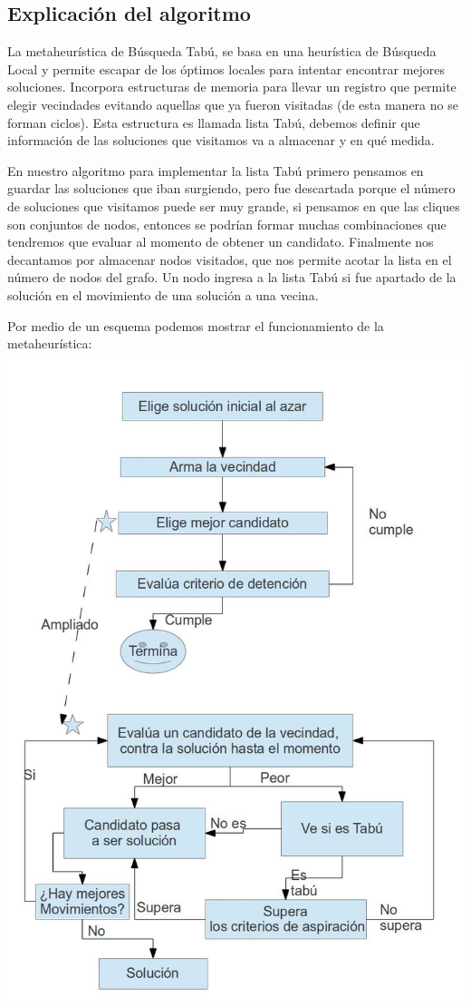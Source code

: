 \subsection{Explicaci\'on del algoritmo}
La metaheurística de Búsqueda Tabú, se basa en una heurística de Búsqueda Local y permite escapar de los óptimos locales para intentar encontrar mejores soluciones. Incorpora estructuras de memoria para llevar un registro que permite elegir vecindades evitando aquellas que ya fueron visitadas (de esta manera no se forman ciclos). Esta estructura es llamada lista Tabú, debemos definir que información de las soluciones que visitamos va a almacenar y en qué medida.

En nuestro algoritmo para implementar la lista Tabú primero pensamos en guardar las soluciones que iban surgiendo, pero fue descartada porque el número de soluciones que visitamos puede ser muy grande, si pensamos en que las cliques son conjuntos de nodos, entonces se podrían formar muchas combinaciones que tendremos que evaluar al momento de obtener un candidato.
Finalmente nos decantamos por almacenar nodos visitados, que nos permite acotar la lista en el número de nodos del grafo. Un nodo ingresa a la lista Tabú si fue apartado de la solución en el movimiento de una solución a una vecina. 

Por medio de un esquema podemos mostrar el funcionamiento de la metaheurística:
\includegraphics{tabu/esquema.jpg}


